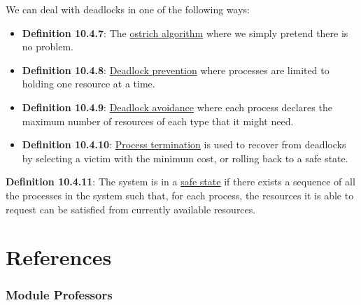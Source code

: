 \documentclass{article}
\newcommand{\separate}[1] {\vspace{#1 pt}\noindent}
\newcommand{\definition}[2]{\textbf{Definition #1}: #2\label{def:#1}}
\begin{document}
\separate{7}We can deal with deadlocks in one of the following ways:
\begin{itemize}
    \item \definition{10.4.7}{The \underline{ostrich algorithm} where we simply pretend there is no problem.}
    \item \definition{10.4.8}{\underline{Deadlock prevention} where processes are limited to holding one resource at a time.}
    \item \definition{10.4.9}{\underline{Deadlock avoidance} where each process declares the maximum number of resources of each type that it might need.}
    \item \definition{10.4.10}{\underline{Process termination} is used to recover from deadlocks by selecting a victim with the minimum cost, or rolling back to a safe state.}
\end{itemize}

\separate{7}\definition{10.4.11}{The system is in a \underline{safe state} if there exists a sequence of all the processes in the system such that, for each process, the resources it is able to request can be satisfied from currently available resources. }

\newpage\part{References}

\section{Module Professors}
\end{document}
